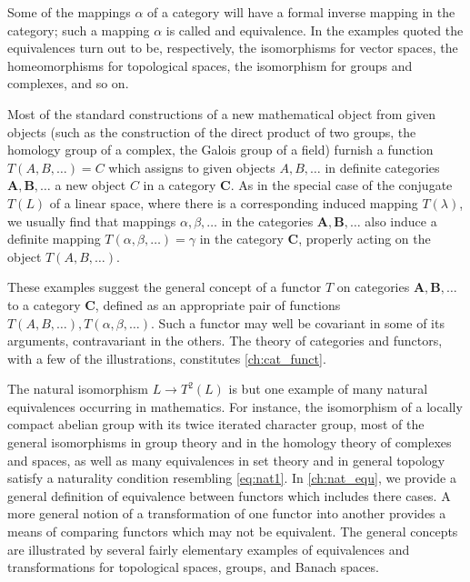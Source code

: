 \documentclass[11pt,a4paper]{report}
\begin{document}
Some of the mappings $\alpha$ of a category will have a formal inverse mapping in the category; such a mapping $\alpha$ is called
and equivalence. In the examples quoted the equivalences turn out to be, respectively, the isomorphisms for vector spaces,
the homeomorphisms for topological spaces, the isomorphism for groups and complexes, and so on.

Most of the standard constructions of a new mathematical object from given objects (such as the construction of the
direct product of two groups, the homology group of a complex, the Galois group of a field) furnish a function 
$T(A,B,\dotsc)=C$ which assigns to given objects $A,B,\dotsc$ in definite categories $\mathbf{A,B},\dotsc$ a new object
$C$ in a category $\mathbf{C}$. As in the special case of the conjugate $T(L)$ of a linear space, where there is a
corresponding induced mapping $T(\lambda)$, we usually find that mappings $\alpha,\beta,\dotsc$ in the categories
$\mathbf{A,B,\dotsc}$ also induce a definite mapping $T(\alpha,\beta,\dotsc)=\gamma$ in the category $\mathbf{C}$,
properly acting on the object $T(A,B,\dotsc)$.

These examples suggest the general concept of a functor $T$ on categories $\mathbf{A,B,\dotsc}$ to a category $\mathbf{C}$,
defined as an appropriate pair of functions $T(A,B,\dotsc),T(\alpha,\beta,\dotsc)$. Such a functor may well be covariant in
some of its arguments, contravariant in the others. The theory of categories and functors, with a few of the illustrations,
constitutes \cref{ch:cat_funct}.

The natural isomorphism $L\rightarrow T^2(L)$ is but one example of many natural equivalences occurring in mathematics.
For instance, the isomorphism of a locally compact abelian group with its twice iterated character group, most of the
general isomorphisms in group theory and in the homology theory of complexes and spaces, as well as many equivalences in
set theory and in general topology satisfy a naturality condition resembling \cref{eq:nat1}.
In \cref{ch:nat_equ}, we provide a general definition of equivalence between functors which includes there cases.
A more general notion of a transformation of one functor into another provides a means of comparing functors which may not
be equivalent. The general concepts are illustrated by several fairly elementary examples of equivalences and transformations
for topological spaces, groups, and Banach spaces.
\end{document}
